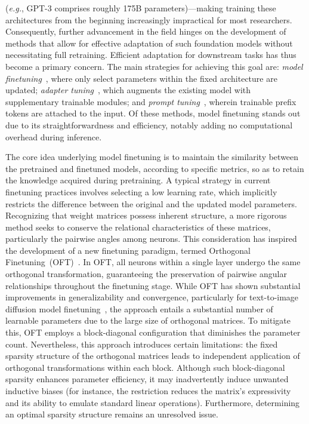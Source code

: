 (\emph{e.g.}, GPT-3 comprises roughly 175B parameters)—making training these architectures from the beginning increasingly impractical for most researchers. Consequently, further advancement in the field hinges on the development of methods that allow for effective adaptation of such foundation models without necessitating full retraining. Efficient adaptation for downstream tasks has thus become a primary concern. The main strategies for achieving this goal are: \emph{model finetuning}~\cite{hulora2022,zaken2022bitfit,guo2020parameter,raffel2020exploring,qiu2023controlling,zhang2022adaptive,chavan2023one}, where only select parameters within the fixed architecture are updated; \emph{adapter tuning}~\cite{rebuffi2017learning,houlsby2019parameter,pfeiffer2020adapterfusion,lin2020exploring,he2021towards}, which augments the existing model with supplementary trainable modules; and \emph{prompt tuning}~\cite{li2021prefix,lester2021power}, wherein trainable prefix tokens are attached to the input. Of these methods, model finetuning stands out due to its straightforwardness and efficiency, notably adding no computational overhead during inference.

The core idea underlying model finetuning is to maintain the similarity between the pretrained and finetuned models, according to specific metrics, so as to retain the knowledge acquired during pretraining. A typical strategy in current finetuning practices involves selecting a low learning rate, which implicitly restricts the difference between the original and the updated model parameters. Recognizing that weight matrices possess inherent structure, a more rigorous method seeks to conserve the relational characteristics of these matrices, particularly the pairwise angles among neurons. This consideration has inspired the development of a new finetuning paradigm, termed Orthogonal Finetuning~(OFT)~\cite{qiu2023controlling}. In OFT, all neurons within a single layer undergo the same orthogonal transformation, guaranteeing the preservation of pairwise angular relationships throughout the finetuning stage. While OFT has shown substantial improvements in generalizability and convergence, particularly for text-to-image diffusion model finetuning~\cite{qiu2023controlling}, the approach entails a substantial number of learnable parameters due to the large size of orthogonal matrices. To mitigate this, OFT employs a block-diagonal configuration that diminishes the parameter count. Nevertheless, this approach introduces certain limitations: the fixed sparsity structure of the orthogonal matrices leads to independent application of orthogonal transformations within each block. Although such block-diagonal sparsity enhances parameter efficiency, it may inadvertently induce unwanted inductive biases (for instance, the restriction reduces the matrix’s expressivity and its ability to emulate standard linear operations). Furthermore, determining an optimal sparsity structure remains an unresolved issue.

